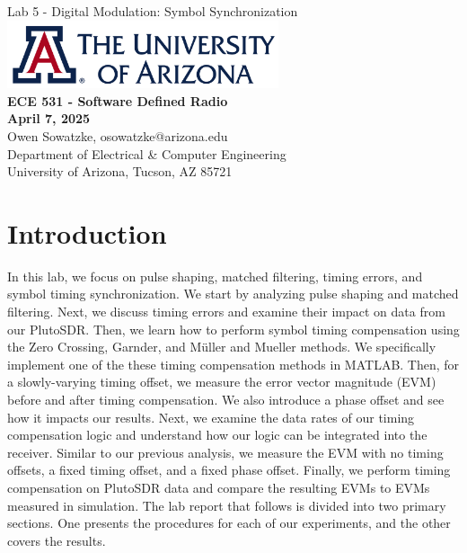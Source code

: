 \documentclass{article}
\begin{document}
\begin{titlepage}
	\centering
	{\huge Lab 5 - Digital Modulation: Symbol Synchronization}\\[0.25 in]
	\includegraphics[width=0.6\textwidth]{ua_logo.png}\\[0.25 in]
	{\large \textbf{ECE 531 - Software Defined Radio\\[0.25 in]
	April 7, 2025\\[0.25 in]}}
	{\large Owen Sowatzke, osowatzke@arizona.edu\\[0.05 in]
	Department of Electrical \& Computer Engineering\\[0.05 in]
	University of Arizona, Tucson, AZ 85721\\[0.5 in]}
	\hypersetup{linkcolor=navy-blue}
	\noindent\hrulefill
	\tableofcontents
	\noindent\hrulefill
\end{titlepage}


\section{Introduction}

In this lab, we focus on pulse shaping, matched filtering, timing errors, and symbol timing synchronization. We start by analyzing pulse shaping and matched filtering. Next, we discuss timing errors and examine their impact on data from our PlutoSDR. Then, we learn how to perform symbol timing compensation using the Zero Crossing, Garnder, and M\"{u}ller and Mueller methods. We specifically implement one of the these timing compensation methods in MATLAB. Then, for a slowly-varying timing offset, we measure the error vector magnitude (EVM) before and after timing compensation. We also introduce a phase offset and see how it impacts our results. Next, we examine the data rates of our timing compensation logic and understand how our logic can be integrated into the receiver. Similar to our previous analysis, we measure the EVM with no timing offsets, a fixed timing offset, and a fixed phase offset. Finally, we perform timing compensation on PlutoSDR data and compare the resulting EVMs to EVMs measured in simulation.  The lab report that follows is divided into two primary sections. One presents the procedures for each of our experiments, and the other covers the results.  
\end{document}

